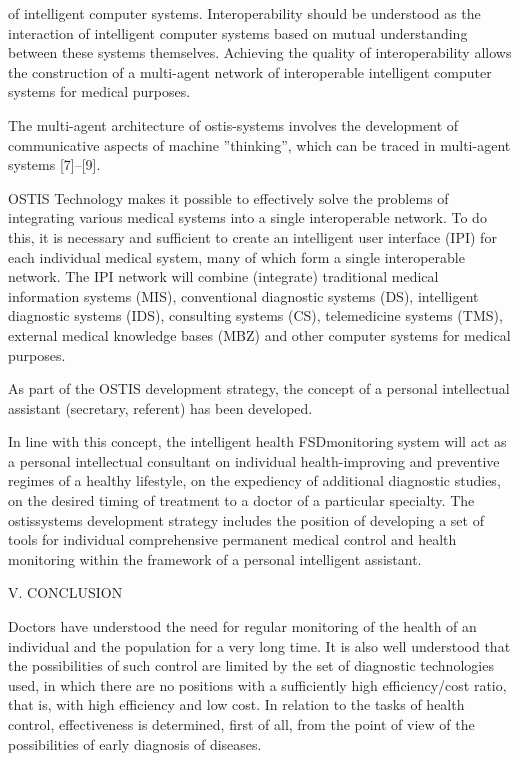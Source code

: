 \documentclass{article}
\begin{document}
\begin{multicols*}{2}
of intelligent computer systems. Interoperability should
be understood as the interaction of intelligent computer
systems based on mutual understanding between these
systems themselves. Achieving the quality of interoperability allows the construction of a multi-agent network
of interoperable intelligent computer systems for medical
purposes.

The multi-agent architecture of ostis-systems involves
the development of communicative aspects of machine
”thinking”, which can be traced in multi-agent systems
[7]–[9].

OSTIS Technology makes it possible to effectively
solve the problems of integrating various medical systems into a single interoperable network. To do this,
it is necessary and sufficient to create an intelligent
user interface (IPI) for each individual medical system,
many of which form a single interoperable network. The
IPI network will combine (integrate) traditional medical
information systems (MIS), conventional diagnostic systems (DS), intelligent diagnostic systems (IDS), consulting systems (CS), telemedicine systems (TMS), external
medical knowledge bases (MBZ) and other computer
systems for medical purposes.

As part of the OSTIS development strategy, the concept of a personal intellectual assistant (secretary, referent) has been developed.

In line with this concept, the intelligent health FSDmonitoring system will act as a personal intellectual
consultant on individual health-improving and preventive
regimes of a healthy lifestyle, on the expediency of
additional diagnostic studies, on the desired timing of
treatment to a doctor of a particular specialty. The ostissystems development strategy includes the position of
developing a set of tools for individual comprehensive
permanent medical control and health monitoring within
the framework of a personal intelligent assistant.
\begin{center}
    V. CONCLUSION
\end{center}
Doctors have understood the need for regular monitoring of the health of an individual and the population
for a very long time. It is also well understood that
the possibilities of such control are limited by the set
of diagnostic technologies used, in which there are no
positions with a sufficiently high efficiency/cost ratio,
that is, with high efficiency and low cost. In relation to
the tasks of health control, effectiveness is determined,
first of all, from the point of view of the possibilities of
early diagnosis of diseases.


\end{multicols*}
\end{document}
